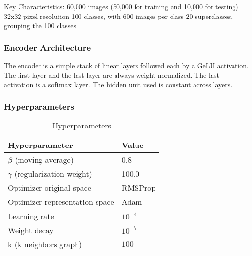 Key Characteristics: 60,000 images (50,000 for training and 10,000 for testing)
32x32 pixel resolution 100 classes, with 600 images per class 20 superclasses,
grouping the 100 classes

\subsubsection{Encoder Architecture}
The encoder is a simple stack of linear layers followed each by a GeLU activation.
The first layer and the last layer are always weight-normalized. The last
activation is a softmax layer. The hidden unit used is constant across layers.

\subsubsection{Hyperparameters}

\begin{table}[ht!]
	\caption{Hyperparameters}\label{tab:}
	\begin{center}
		\begin{tabular}[c]{|l|l|}
			\hline
			{Hyperparameter}                & Value     \\
			\hline
			$\beta$ (moving average)       & 0.8       \\
			\hline
			$\gamma$ (regularization weight) & 100.0     \\
			\hline
			Optimizer original space        & RMSProp   \\
			\hline
			Optimizer representation space  & Adam      \\
			\hline
			Learning rate                   & $10^{-4}$ \\
			\hline
			Weight decay                    & $10^{-7}$ \\
			\hline
			k (k neighbors graph)           & $100$     \\
			\hline
		\end{tabular}
	\end{center}
\end{table}